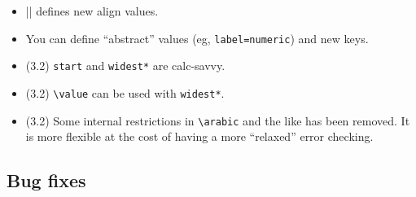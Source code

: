 \documentclass[a4paper]{ltxguide}
\newcommand\3{\unskip\enspace\fbox{\fontsize{4}{4}\selectfont NEW 3.0}}
\begin{document}
\begin{enumerate}[leftmargin=*]
\begin{enumerate}[leftmargin=\parindent]
\begin{enumerate}[labelindent=\parindent,|\allowbreak
| leftmargin=*,|\allowbreak| label=\Roman*.,|\allowbreak
| widest=IV,|\allowbreak| align=left]
\begin{enumerate}[label=\fbox{\arabic*}]
\begin{itemize}
\item|\SetLabelAlign| defines new align values.

\item You can define ``abstract'' values (eg, \verb|label=numeric|) and
new keys.
\end{itemize}

\begin{itemize}
\item (3.2) \verb|start| and \verb|widest*| are \textsf{calc}-savvy.
\item (3.2) \verb|\value| can be used with \verb|widest*|.
\item (3.2) Some internal restrictions in \verb|\arabic| and the like
has been removed.  It is more flexible at the cost of having a more
``relaxed'' error checking.
\end{itemize}
\subsection{Bug fixes}


\end{enumerate}
\end{enumerate}
\end{enumerate}
\end{enumerate}
\end{document}
